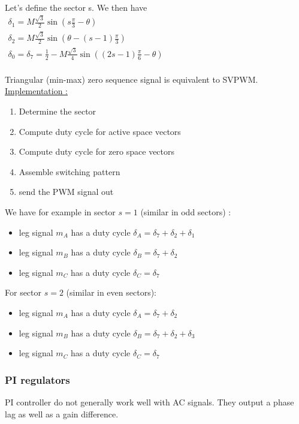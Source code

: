 \documentclass[../main.tex]{subfiles}
\begin{document}
Let's define the sector s. We then have $\begin{matrix}
\delta_1 = M \frac{\sqrt{3}}{2} \sin( s \frac{\pi}{3} - \theta)\\
\delta_2 = M \frac{\sqrt{3}}{2} \sin(\theta- (s-1) \frac{\pi}{3})\\
\delta_0 = \delta_7 = \frac{1}{2} - M \frac{\sqrt{3}}{4} \sin((2s-1) \frac{\pi}{6} - \theta)\\
\end{matrix}$

\warning Triangular (min-max) zero sequence signal is equivalent to SVPWM.\\

\quad \underline{Implementation :}\\
\begin{enumerate}
    \item Determine the sector
    \item Compute duty cycle for active space vectors
    \item Compute duty cycle for zero space vectors
    \item Assemble switching pattern
    \item send the PWM signal out
\end{enumerate}


We have for example in sector $s= 1$ (similar in odd sectors) : \begin{itemize}
    \item leg signal $m_A$ has a duty cycle $\delta_A = \delta_7 + \delta_2 + \delta_1$
    \item leg signal $m_B$ has a duty cycle $\delta_B = \delta_7 + \delta_2$
    \item leg signal $m_C$ has a duty cycle $\delta_C = \delta_7$
\end{itemize}

For sector $s=2$ (similar in even sectors): \begin{itemize}
    \item leg signal $m_A$ has a duty cycle $\delta_A = \delta_7 + \delta_2$
    \item leg signal $m_B$ has a duty cycle $\delta_B = \delta_7 + \delta_2 + \delta_3$
    \item leg signal $m_C$ has a duty cycle $\delta_C = \delta_7$
\end{itemize}

\subsubsection{PI regulators}
PI controller do not generally work well with AC signals. They output a phase lag as well as a gain difference.\\
\end{document}
